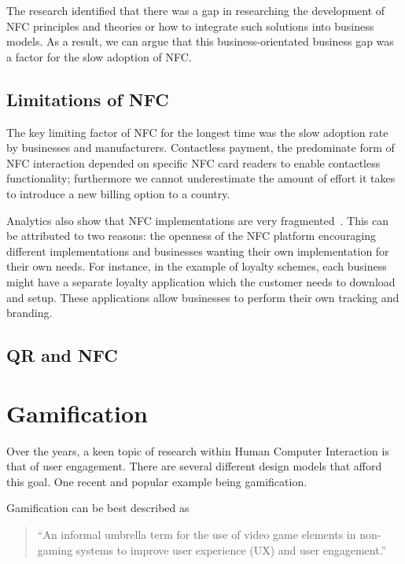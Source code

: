 The research identified that there was a gap in researching the development of NFC principles and theories or how to integrate such solutions into business models. As a result, we can argue that this business-orientated business gap was a factor for the slow adoption of NFC.
\subsection{Limitations of NFC}
The key limiting factor of NFC for the longest time was the slow adoption rate by businesses and manufacturers. Contactless payment, the predominate form of NFC interaction depended on specific NFC card readers to enable contactless functionality; furthermore we cannot underestimate the amount of effort it takes to introduce a new billing option to a country.

Analytics also show that NFC implementations are very fragmented~\cite{fragmentednfc}. This can be attributed to two reasons: the openness of the NFC platform encouraging different implementations and businesses wanting their own implementation for their own needs. For instance, in the example of loyalty schemes, each business might have a separate loyalty application which the customer needs to download and setup. These applications allow businesses to perform their own tracking and branding.
\subsection{QR and NFC}
\clearpage{}
\section{Gamification}
Over the years, a keen topic of research within Human Computer Interaction is that of user engagement. There are several different design models that afford this goal. One recent and popular example being gamification. 

Gamification can be best described as
\begin{quotation}
\noindent
``An informal umbrella term for the use of video game elements in non-gaming systems to improve user experience (UX) and user engagement.''~\cite[p.~2425]{Deterding:2011:GUG:1979742.1979575}
 \end{quotation}

